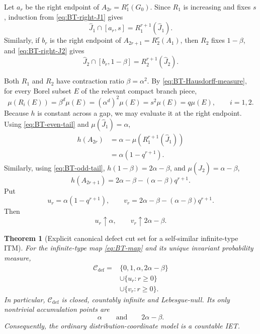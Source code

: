 \documentclass[11pt]{amsart}
\theoremstyle{plain}
\newtheorem{theorem}{Theorem}[section]
\theoremstyle{definition}
\theoremstyle{remark}
\newcommand{\cC}{\mathcal C}
\begin{document}
Let \(a_r\) be the right endpoint of \(A_{2r}=R_1^r(G_0)\). Since \(R_1\) is increasing
and fixes \(s\), induction from \eqref{eq:BT-right-J1} gives
\[
        \widehat J_1\cap[a_r,s]
        =R_1^{r+1}(\widehat J_1).
\tag{8.32}
\label{eq:BT-even-tail}
\]
Similarly, if \(b_r\) is the right endpoint of
\(A_{2r+1}=R_2^r(A_1)\), then \(R_2\) fixes \(1-\beta\), and
\eqref{eq:BT-right-J2} gives
\[
        \widehat J_2\cap[b_r,1-\beta]
        =R_2^{r+1}(\widehat J_2).
\tag{8.33}
\label{eq:BT-odd-tail}
\]

Both \(R_1\) and \(R_2\) have contraction ratio \(\beta=\alpha^2\). By
\eqref{eq:BT-Hausdorff-measure}, for every Borel subset \(E\) of the relevant compact branch
piece,
\[
        \mu(R_i(E))
        =\beta^d\mu(E)
        =(\alpha^d)^2\mu(E)
        =s^2\mu(E)
        =q\mu(E),
        \qquad i=1,2.
\tag{8.34}
\label{eq:BT-measure-scaling}
\]
Because \(h\) is constant across a gap, we may evaluate it at the right endpoint. Using
\eqref{eq:BT-even-tail} and \(\mu(\widehat J_1)=\alpha\),
\[
\begin{aligned}
h(A_{2r})
&=\alpha-\mu(R_1^{r+1}(\widehat J_1))\\
&=\alpha(1-q^{r+1}).
\end{aligned}
\tag{8.35}
\label{eq:BT-even-cuts}
\]
Similarly, using \eqref{eq:BT-odd-tail},
\(h(1-\beta)=2\alpha-\beta\), and
\(\mu(\widehat J_2)=\alpha-\beta\),
\[
        h(A_{2r+1})
        =2\alpha-\beta-(\alpha-\beta)q^{r+1}.
\tag{8.36}
\label{eq:BT-odd-cuts}
\]
Put
\[
        u_r=\alpha(1-q^{r+1}),
        \qquad
        v_r=2\alpha-\beta-(\alpha-\beta)q^{r+1}.
\tag{8.37}
\label{eq:BT-cut-sequences}
\]
Then
\[
        u_r\uparrow\alpha,
        \qquad
        v_r\uparrow2\alpha-\beta.
\tag{8.38}
\label{eq:BT-cut-limits}
\]

\begin{theorem}[Explicit canonical defect cut set for a self-similar infinite-type ITM]
\label{thm:BT-explicit-Cdef}
For the infinite-type map \eqref{eq:BT-map} and its unique invariant probability measure,
\[
\boxed{
\begin{aligned}
\cC_{\mathrm{def}}
={}&
\{0,1,\alpha,2\alpha-\beta\}\\
&\cup\{u_r:r\geq0\}\\
&\cup\{v_r:r\geq0\}.
\end{aligned}
}
\tag{8.39}
\label{eq:BT-Cdef}
\]
In particular, \(\cC_{\mathrm{def}}\) is closed, countably infinite and Lebesgue-null. Its
only nontrivial accumulation points are
\[
        \alpha
        \qquad\text{and}\qquad
        2\alpha-\beta.
\]
Consequently, the ordinary distribution-coordinate model is a countable IET.
\end{theorem}
\end{document}
